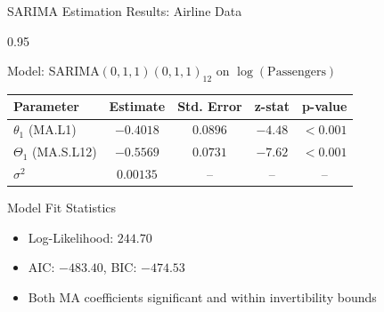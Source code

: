 \documentclass[9pt, aspectratio=169, t]{beamer}
\begin{document}
\begin{frame}{SARIMA Estimation Results: Airline Data}
    \begin{cminipage}{0.95\textwidth}
    {\small
    \begin{block}{Model: SARIMA$(0,1,1)(0,1,1)_{12}$ on $\log(\text{Passengers})$}
        \begin{center}
        \begin{tabular}{lcccc}
            \toprule
            \textbf{Parameter} & \textbf{Estimate} & \textbf{Std. Error} & \textbf{z-stat} & \textbf{p-value} \\
            \midrule
            $\theta_1$ (MA.L1) & $-0.4018$ & $0.0896$ & $-4.48$ & $<0.001$ \\
            $\Theta_1$ (MA.S.L12) & $-0.5569$ & $0.0731$ & $-7.62$ & $<0.001$ \\
            $\sigma^2$ & $0.00135$ & -- & -- & -- \\
            \bottomrule
        \end{tabular}
        \end{center}
    \end{block}

    \vspace{0.2cm}

    \begin{exampleblock}{Model Fit Statistics}
        \begin{itemize}\setlength{\itemsep}{0pt}
            \item Log-Likelihood: $244.70$
            \item AIC: $-483.40$, BIC: $-474.53$
            \item Both MA coefficients significant and within invertibility bounds
        \end{itemize}
    \end{exampleblock}
    }
    \end{cminipage}
\end{frame}
\end{document}
